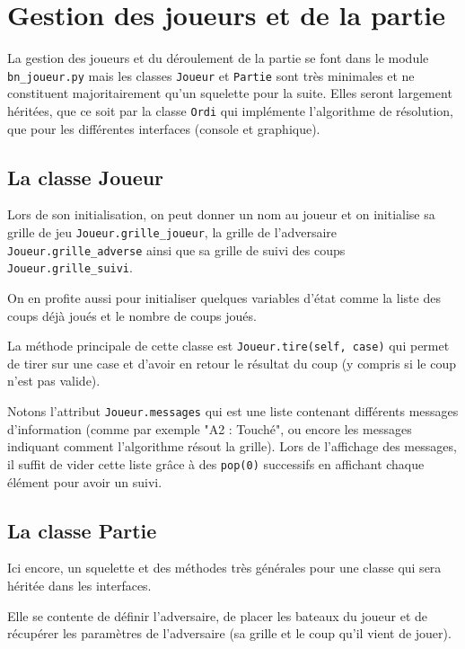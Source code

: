 \chapter{Gestion des joueurs et de la partie}\label{chap_joueurs}

La gestion des joueurs et du déroulement de la partie se font dans le module \texttt{bn\_joueur.py} mais les classes \texttt{Joueur} et \texttt{Partie} sont très minimales et ne constituent majoritairement qu'un squelette pour la suite. Elles seront largement héritées, que ce soit par la classe \texttt{Ordi} qui implémente l'algorithme de résolution, que pour les différentes interfaces (console et graphique).

\section{La classe Joueur}
Lors de son initialisation, on peut donner un nom au joueur et on initialise sa grille de jeu \texttt{Joueur.grille\_joueur}, la grille de l'adversaire \texttt{Joueur.grille\_adverse} ainsi que sa grille de suivi des coups \texttt{Joueur.grille\_suivi}.

On en profite aussi pour initialiser quelques variables d'état comme la liste des coups déjà joués et le nombre de coups joués.

La méthode principale de cette classe est \texttt{Joueur.tire(self, case)} qui permet de tirer sur une case et d'avoir en retour le résultat du coup (y compris si le coup n'est pas valide).

\medskip

Notons l'attribut \texttt{Joueur.messages} qui est une liste contenant différents messages d'information (comme par exemple "A2 : Touché", ou encore les messages indiquant comment l'algorithme résout la grille). Lors de l'affichage des messages, il suffit de vider cette liste grâce à des \texttt{pop(0)} successifs en affichant chaque élément pour avoir un suivi.

\section{La classe Partie}
Ici encore, un squelette et des méthodes très générales pour une classe qui sera héritée dans les interfaces.

Elle se contente de définir l'adversaire, de placer les bateaux du joueur et de récupérer les paramètres de l'adversaire (sa grille et le coup qu'il vient de jouer).


